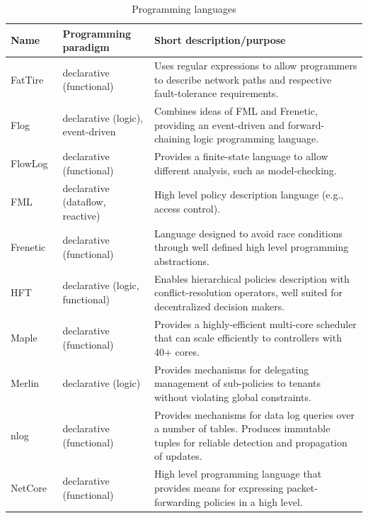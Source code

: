 {\renewcommand{\arraystretch}{1.4}
\begin{table}[!htp]
\caption{Programming languages}
\label{tab:programminglanguages}
\begin{center}
\footnotesize
\begin{tabularx}{\linewidth}{p{2cm}p{4cm}X}
\hline
\textbf{Name} & \textbf{Programming paradigm} & \textbf{Short description/purpose} \\\hline
FatTire~\cite{reitblatt2013}  & declarative (functional) & Uses regular expressions to allow programmers to describe network paths and respective fault-tolerance requirements. \\\hline
Flog~\cite{katta2012}  & declarative (logic), event-driven & Combines ideas of FML and Frenetic, providing an event-driven and forward-chaining logic programming language. \\\hline
FlowLog~\cite{nelson2014} & declarative (functional) & Provides a finite-state language to allow different analysis, such as model-checking.\\\hline
FML~\cite{hinrichs2009} & declarative (dataflow, reactive) & High level policy description language (e.g., access control).  \\\hline
Frenetic~\cite{foster2011} & declarative (functional) & Language designed to avoid race conditions through well defined high level programming abstractions.  \\\hline
HFT~\cite{ferguson2012}  & declarative (logic, functional) & Enables hierarchical policies description with conflict-resolution operators, well suited for decentralized decision makers. \\\hline
Maple~\cite{voellmy2013} & declarative (functional) & Provides a highly-efficient multi-core scheduler that can scale efficiently to controllers with 40+ cores. \\\hline
Merlin~\cite{soule2013} & declarative (logic) & Provides mechanisms for delegating management of sub-policies to tenants without violating global constraints. \\\hline
nlog~\cite{koponen} & declarative (functional) &  Provides mechanisms for data log queries over a number of tables. Produces immutable tuples for reliable detection and propagation of updates. \\\hline

NetCore~\cite{monsanto2012}  & declarative (functional) & High level programming language that provides means for expressing packet-forwarding policies in a high level.  \\\hline


\end{tabularx}
\end{center}
\end{table}}
